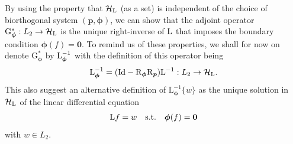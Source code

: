 \documentclass[11pt, english,english]{article}
\newcommand{\Lop}{{\rm L}}
\def\V#1{{\boldsymbol{#1}}}         %
\def\Spc#1{{\mathcal{#1}}}  %
\def\Op#1{{\mathrm{#1}}}  %
\def\Identity{\mathrm{Id}} %
\newcommand{\embedD}{\xhookrightarrow{\mbox{\tiny \rm d.}}}
\newcommand{\toC}{\xrightarrow{\mbox{\tiny \ \rm c.  }}}
\renewcommand{\[}{\begin{equation}}
\renewcommand{\]}[1]{\label{eq:#1}\end{equation}}
\begin{document}
By using the property that $\Spc H_\Lop$ (as a set) is independent of the choice of biorthogonal system $(\V p, \V \phi)$, we can show that the adjoint operator $\Op G^\ast_{\V \phi}:
L_2 \to \Spc H_\Lop$ is the unique right-inverse of $\Lop$ that imposes the boundary condition $\V \phi(f)=\V 0$. To remind us of these properties, we shall for now on denote $\Op G^\ast_{\V \phi}$ by $\Lop^{{-1}}_{\V \phi}$ with the definition of this operator being
\begin{align}
\label{Eq:gInverse}
\Op L^{-1}_{\V \phi}=(\Identity-\Op R_{\V \phi}\Op R_{\V p})\Lop^{-1}: L_2 \to \Spc H_\Lop.
\end{align}
This also suggest an alternative definition of $\Op L^{-1}_{\V \phi}\{w\}$
as the unique solution in $\Spc H_\Lop$ of the linear differential equation
\begin{align}
\Lop f=w\quad \mbox{s.t.}\quad \V \phi(f)=\V 0
\label{Eq:PDE}
\end{align}
with $w\in L_2$. 
%
%
\end{document}
